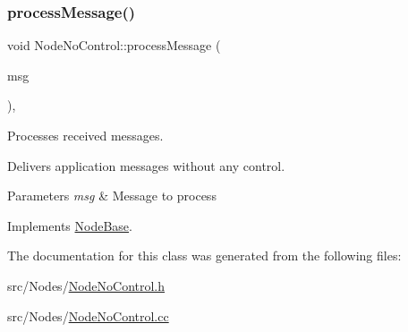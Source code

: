 \subsubsection{\texorpdfstring{process\+Message()}{processMessage()}}
{\footnotesize\ttfamily void Node\+No\+Control\+::process\+Message (\begin{DoxyParamCaption}\item[{c\+Message $\ast$}]{msg }\end{DoxyParamCaption})\hspace{0.3cm}{\ttfamily [private]}, {\ttfamily [virtual]}}



Processes received messages. 

Delivers application messages without any control. 
\begin{DoxyParams}{Parameters}
{\em msg} & Message to process \\
\hline
\end{DoxyParams}


Implements \hyperlink{class_node_base_ae70b168f2bc7407c249594b1c614301c}{Node\+Base}.



The documentation for this class was generated from the following files\+:\begin{DoxyCompactItemize}
\item 
src/\+Nodes/\hyperlink{_node_no_control_8h}{Node\+No\+Control.\+h}\item 
src/\+Nodes/\hyperlink{_node_no_control_8cc}{Node\+No\+Control.\+cc}\end{DoxyCompactItemize}
